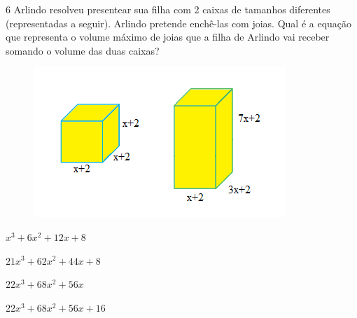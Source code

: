 









\num{6} Arlindo resolveu presentear sua filha com 2 caixas de tamanhos
diferentes (representadas a seguir). Arlindo pretende enchê-las com joias. Qual é a equação que
representa o volume máximo de joias que a filha de Arlindo vai receber
somando o volume das duas caixas?

\begin{figure}[H]
\centering\includegraphics[width=.7\textwidth]{./imgSAEB_8_MAT/media/image55.png}
\end{figure}

\begin{escolha}
\item $x^3 + 6x^2 + 12x + 8$
\item $21x^3 + 62x^2 + 44x + 8$
\item $22x^3 + 68x^2+ 56x$
\item $22x^3 + 68x^2 + 56x + 16$
\end{escolha}



